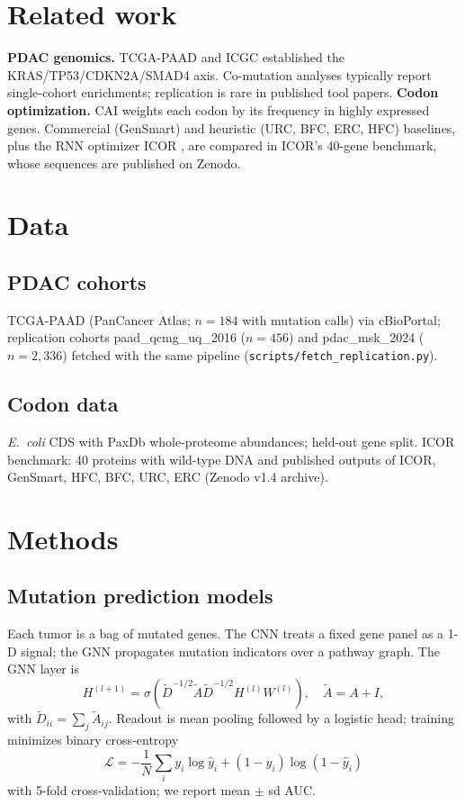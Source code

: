 \documentclass[11pt]{article}
\begin{document}
\section{Related work}
\textbf{PDAC genomics.} TCGA-PAAD and ICGC established the KRAS/TP53/CDKN2A/SMAD4 axis. Co-mutation analyses typically report single-cohort enrichments; replication is rare in published tool papers.
\textbf{Codon optimization.} CAI \citep{sharp1987} weights each codon by its frequency in highly expressed genes. Commercial (GenSmart) and heuristic (URC, BFC, ERC, HFC) baselines, plus the RNN optimizer ICOR \citep{jain2023}, are compared in ICOR's 40-gene benchmark, whose sequences are published on Zenodo.
\section{Data}
\subsection{PDAC cohorts}
TCGA-PAAD (PanCancer Atlas; $n=184$ with mutation calls) via cBioPortal; replication cohorts paad\_qcmg\_uq\_2016 ($n=456$) and pdac\_msk\_2024 ($n=2{,}336$) fetched with the same pipeline (\texttt{scripts/fetch\_replication.py}).
\subsection{Codon data}
\emph{E.~coli} CDS with PaxDb whole-proteome abundances; held-out gene split. ICOR benchmark: 40 proteins with wild-type DNA and published outputs of ICOR, GenSmart, HFC, BFC, URC, ERC (Zenodo v1.4 archive).
\section{Methods}
\subsection{Mutation prediction models}
Each tumor is a bag of mutated genes. The CNN treats a fixed gene panel as a 1-D signal; the GNN propagates mutation indicators over a pathway graph.
The GNN layer is
\begin{equation}
H^{(l+1)}=\sigma\!\left(\tilde D^{-1/2}\tilde A\tilde D^{-1/2}H^{(l)}W^{(l)}\right),\quad \tilde A=A+I,
\end{equation}
with $\tilde D_{ii}=\sum_j \tilde A_{ij}$. Readout is mean pooling followed by a logistic head; training minimizes binary cross-entropy
\begin{equation}
\mathcal L=-\frac1N\sum_i y_i\log\hat y_i+(1-y_i)\log(1-\hat y_i)
\end{equation}
with 5-fold cross-validation; we report mean $\pm$ sd AUC.
\end{document}
